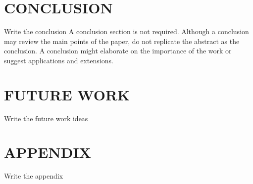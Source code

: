 \documentclass[letterpaper, 10 pt, conference]{IEEEconf}
\newcommand{\todo}[1]{{\color{red}#1}}
\begin{document}
\section{CONCLUSION}

\todo{Write the conclusion}
A conclusion section is not required. Although a conclusion may review the main points of the paper, do not replicate the abstract as the conclusion. A conclusion might elaborate on the importance of the work or suggest applications and extensions.

\section{FUTURE WORK}

\todo{Write the future work ideas}

\addtolength{\textheight}{-12cm}


\section*{APPENDIX}

\todo{Write the appendix}


\nocite{*}
\printbibliography
\end{document}
